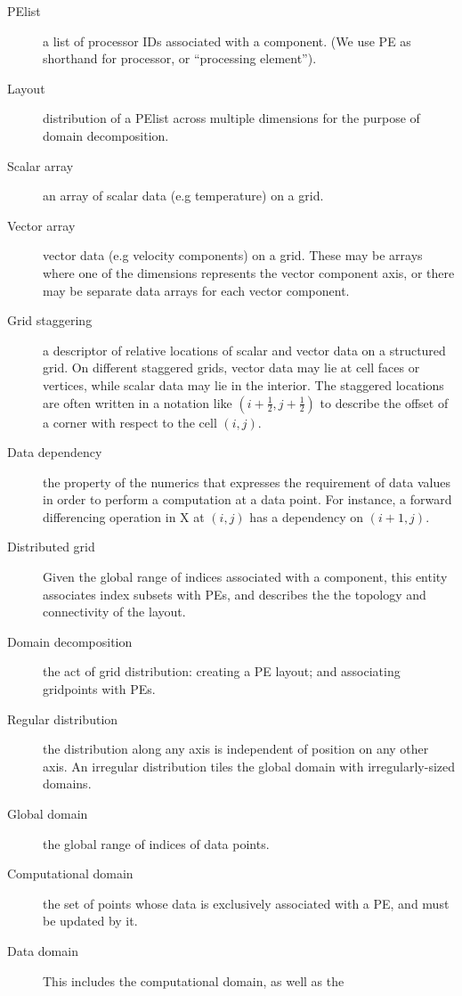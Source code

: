 
\begin{description}
\item[PElist] a list of processor IDs associated with a component. (We
  use PE as shorthand for processor, or ``processing element'').
\item[Layout] distribution of a PElist across multiple dimensions for
  the purpose of domain decomposition.
\item[Scalar array] an array of scalar data (e.g temperature) on a
  grid.
\item[Vector array] vector data (e.g velocity components) on a
  grid. These may be arrays where one of the dimensions represents the
  vector component axis, or there may be separate data arrays for each
  vector component.
\item[Grid staggering] a descriptor of relative locations of scalar and
  vector data on a structured grid. On different staggered grids,
  vector data may lie at cell faces or vertices, while scalar data may
  lie in the interior. The staggered locations are often written
  in a notation like $(i+\frac12,j+\frac12)$ to describe the offset of
  a corner with respect to the cell $(i,j)$.
\item[Data dependency] the property of the numerics that expresses the
  requirement of data values in order to perform a
  computation at a data point. For instance, a forward differencing
  operation in X at $(i,j)$ has a dependency on $(i+1,j)$.
\item[Distributed grid] Given the global range of indices associated
  with a component, this entity associates index subsets with PEs, and
  describes the the topology and connectivity of the layout.
\item[Domain decomposition] the act of grid distribution: creating a
  PE layout; and associating gridpoints with PEs.
\item[Regular distribution] the distribution along any axis is
  independent of position on any other axis. An irregular distribution
  tiles the global domain with irregularly-sized domains.
\item[Global domain] the global range of indices of data points.
\item[Computational domain] the set of points whose data is
  exclusively associated with a PE, and must be updated by it.
\item[Data domain] This includes the computational domain, as well as the

\end{description}
